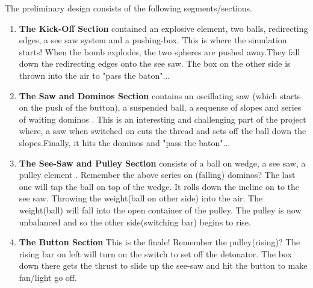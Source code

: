 \documentclass{report}
\begin{document}
The preliminary design consists of the following segments/sections.
\begin{enumerate}{\leftmargin=0em}
\item \textbf{The Kick-Off Section} contained an explosive element\cite{explosion}, two balls, redirecting edges, a see saw system and a pushing-box.
This is where the simulation starts! When the bomb explodes, the two spheres are pushed away.They fall down the redirecting edges onto the see saw. The box on the other side is thrown into the air to "pass the baton"...
\item \textbf{The Saw and Dominos Section} contains an oscillating saw \cite{pendulum} (which starts on the push of the button), a suspended ball, a sequense of slopes and series of waiting dominos \cite{dominos}. 
This is an interesting and challenging part of the project where, a saw when switched on cuts the thread and sets off the ball down the slopes.Finally, it hits the dominos and "pass the baton"...
\item \textbf{The See-Saw and Pulley Section} consists of a ball on wedge, a see saw, a pulley element \cite{pulley}.
Remember the above series on (falling) dominos? The last one will tap the ball on top of the wedge. It rolls down the incline on to the see saw. Throwing the weight(ball on other side) into the air. The weight(ball) will fall into the open container of the pulley. The pulley is now unbalanced and so the other side(switching bar) begins to rise.
\item \textbf{The Button Section} This is the finale! Remember the pulley(rising)? The rising bar on left will turn on the switch to set off the detonator. The box down there gets the thrust to slide up the see-saw and hit the button to make fan/light go off.
\end{enumerate}
\pagebreak

\end{document}
